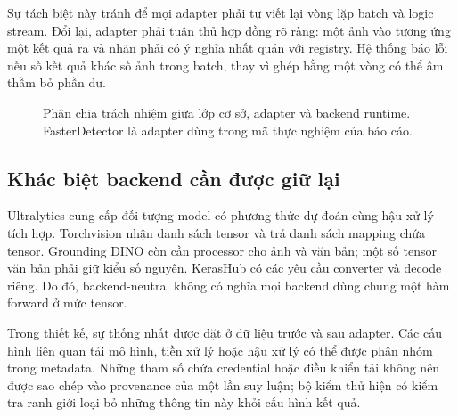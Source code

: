 Sự tách biệt này tránh để mọi adapter phải tự viết lại vòng lặp batch và logic stream. Đổi lại, adapter phải tuân thủ hợp đồng rõ ràng: một ảnh vào tương ứng một kết quả ra và nhãn phải có ý nghĩa nhất quán với registry. Hệ thống báo lỗi nếu số kết quả khác số ảnh trong batch, thay vì ghép bằng một vòng  có thể âm thầm bỏ phần dư.

\begin{figure}[H]\centering
{}
\caption{Phân chia trách nhiệm giữa lớp cơ sở, adapter và backend runtime. FasterDetector là adapter dùng trong mã thực nghiệm của báo cáo.}
\end{figure}

\subsection{Khác biệt backend cần được giữ lại}
Ultralytics cung cấp đối tượng model có phương thức dự đoán cùng hậu xử lý tích hợp. Torchvision nhận danh sách tensor và trả danh sách mapping chứa tensor. Grounding DINO còn cần processor cho ảnh và văn bản; một số tensor văn bản phải giữ kiểu số nguyên. KerasHub có các yêu cầu converter và decode riêng. Do đó, backend-neutral không có nghĩa mọi backend dùng chung một hàm forward ở mức tensor.

Trong thiết kế, sự thống nhất được đặt ở dữ liệu trước và sau adapter. Các cấu hình liên quan tải mô hình, tiền xử lý hoặc hậu xử lý có thể được phân nhóm trong metadata. Những tham số chứa credential hoặc điều khiển tải không nên được sao chép vào provenance của một lần suy luận; bộ kiểm thử hiện có kiểm tra ranh giới loại bỏ những thông tin này khỏi cấu hình kết quả.

